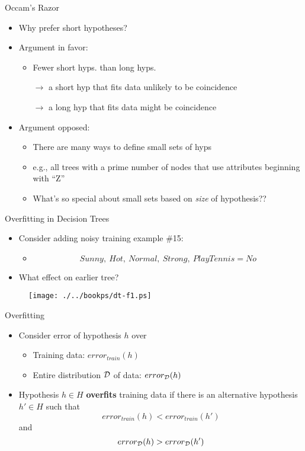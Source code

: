 \documentclass[%
pdf,
colorBG,
slideColor,
tcrico,
]{prosper}
\begin{document}
\begin{slide}{Occam's Razor} 
\begin{itemize} 
 \item Why prefer short hypotheses?
 \item  Argument in favor:
	\begin{itemize}
	\item Fewer short hyps. than long hyps.
	\item[$\to$] a short hyp that fits data unlikely to be coincidence
	\item[$\to$] a long hyp that fits data might be coincidence
	\end{itemize}
\item  Argument opposed:
	\begin{itemize}
	\item There are many ways to define small sets of hyps
	\item e.g., all trees with a prime number of nodes that use attributes
	beginning with ``Z''
	\item What's so special about small sets based on {\em size} of hypothesis??
	\end{itemize}
\end{itemize}
\end{slide}

\begin{slide}{Overfitting in Decision Trees } 
\small
\begin{itemize} 
 \item Consider adding noisy training example \#15:
	\begin{itemize} 
 	\item  \[ Sunny,\  Hot,\  Normal,\  Strong,\ PlayTennis=No \]
	\end{itemize}
\item What effect on earlier tree?
\end{itemize}
\begin{figure}
	\centering
	\texttt{[image: ./../bookps/dt-f1.ps]}
\end{figure}
\end{slide}


\begin{slide}{Overfitting} 
\begin{itemize}
 \item  Consider error of hypothesis $h$ over
	\begin{itemize}
	\item  Training data: $error_{train}(h)$
	\item  Entire distribution $\cal{D}$ of data: $error_{\cal{D}}(h)$
	\end{itemize}
\item Hypothesis $h \in H$ {\bf overfits} training data if there is an alternative hypothesis $h' \in H$ such that
\[  error_{train}(h) < error_{train}(h') \] and \[  error_{\cal{D}}(h) > error_{\cal{D}}(h') \]
\end{itemize}
\end{slide}
\end{document}
